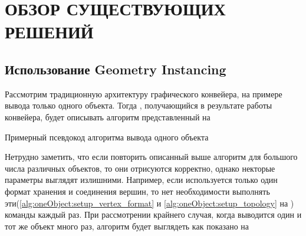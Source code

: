\chapter{ОБЗОР СУЩЕСТВУЮЩИХ РЕШЕНИЙ} \label{ch2}
\section{Использование Geometry Instancing} \label{ch2:instancing} %
	Рассмотрим традиционную архитектуру графического конвейера, на примере вывода только одного объекта. Тогда , получающийся в результате работы конвейера, будет описывать алгоритм представленный на 
	\begin{algorithm} %
		\nonl{}
		\caption{Примерный псевдокод алгоритма вывода одного объекта}\label{alg:oneObject}
	\end{algorithm}
	\FloatBarrier
	
	Нетрудно заметить, что если повторить описанный выше алгоритм для большого числа различных объектов, то они отрисуются корректно, однако некторые параметры выглядят излишними. Например, если используется только один формат хранения и соединения вершин, то нет необходимости выполнять эти(\ref{alg:oneObject:setup_vertex_format} и  \ref{alg:oneObject:setup_topology} на ) команды каждый раз. При рассмотрении крайнего случая, когда выводится один и тот же объект много раз, алгоритм будет выглядеть как показано на 
	
